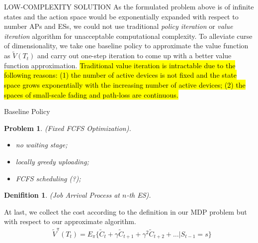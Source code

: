 \documentclass[10pt, conference, letterpaper]{IEEEtran}
\newtheorem{definition}{Denifition}
\newtheorem{problem}{Problem}
\renewcommand{\vec}{\mathbf}
\begin{document}
    \begin{section}{LOW-COMPLEXITY SOLUTION}
        \label{sec:algorithm}
        As the formulated problem above is of infinite states and the action space would be exponentially expanded with respect to number APs and ESs, we could not use traditional \emph{policy iteration} or \emph{value iteration} algorithm \cite{sutton1998introduction} for unacceptable computational complexity. To alleviate curse of dimensionality, we take one baseline policy to approximate the value function as $\tilde{V}(T_t)$ and carry out one-step iteration to come up with a better value function approximation.
        \hl{Traditional value iteration is intractable due to the following reasons: (1) the number of active devices is not fixed and the state space grows exponentially with the increasing number of active devices; (2) the spaces of small-scale fading and path-loss are continuous.}

        \begin{subsection}{Baseline Policy}
            \begin{problem}
                (Fixed FCFS Optimization).
                \begin{itemize}
                    \item no waiting stage;
                    \item locally greedy uploading;
                    \item FCFS scheduling (?);
                \end{itemize}
            \end{problem}

            \begin{definition}
                (Job Arrival Process at $n$-th ES).
            \end{definition}

            At last, we collect the cost according to the definition in our MDP problem but with respect to our approximate algorithm.
            \begin{align}
                & \tilde{V}^{\pi}(T_t)
                \nonumber%
                = E_{\pi} \{ \tilde{C}_{t} + \gamma \tilde{C}_{t+1} + \gamma^2 \tilde{C}_{t+2} + \dots |S_{t-1}=s \}
            \end{align}
        \end{subsection}


\end{section}
\end{document}
